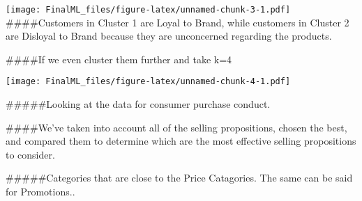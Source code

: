 \documentclass[
]{article}
\newenvironment{Shaded}{\begin{snugshade}}{\end{snugshade}}
\newcommand{\AttributeTok}[1]{\textcolor[rgb]{0.77,0.63,0.00}{#1}}
\newcommand{\DecValTok}[1]{\textcolor[rgb]{0.00,0.00,0.81}{#1}}
\newcommand{\FunctionTok}[1]{\textcolor[rgb]{0.00,0.00,0.00}{#1}}
\newcommand{\NormalTok}[1]{#1}
\newcommand{\OtherTok}[1]{\textcolor[rgb]{0.56,0.35,0.01}{#1}}
\newcommand{\SpecialCharTok}[1]{\textcolor[rgb]{0.00,0.00,0.00}{#1}}
\begin{document}
\texttt{[image: FinalML\_files/figure-latex/unnamed-chunk-3-1.pdf]}
\#\#\#\#Customers in Cluster 1 are Loyal to Brand, while customers in
Cluster 2 are Disloyal to Brand because they are unconcerned regarding
the products.

\#\#\#\#If we even cluster them further and take k=4

\begin{Shaded}
\end{Shaded}

\texttt{[image: FinalML\_files/figure-latex/unnamed-chunk-4-1.pdf]}

\#\#\#\#\#Looking at the data for consumer purchase conduct.

\#\#\#\#We've taken into account all of the selling propositions, chosen
the best, and compared them to determine which are the most effective
selling propositions to consider.

\begin{Shaded}
\end{Shaded}

\#\#\#\#\#Categories that are close to the Price Catagories. The same
can be said for Promotions..
\end{document}
